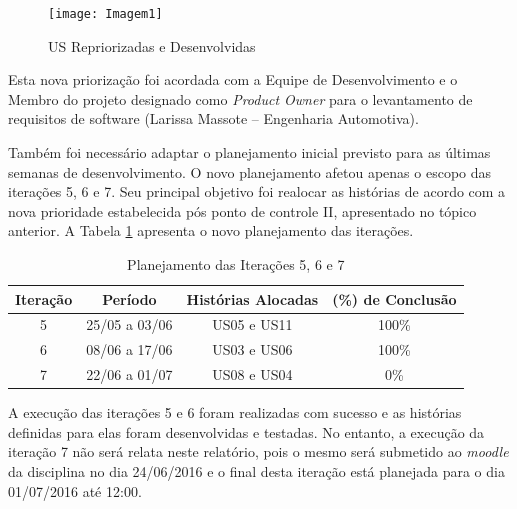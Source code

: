		\begin{figure}[htpb]
			\centering
			\texttt{[image: Imagem1]}
			\caption{US Repriorizadas e Desenvolvidas}
			\label{Imagem1}
		\end{figure}

		Esta nova priorização foi acordada com a Equipe de Desenvolvimento e o Membro do projeto designado como \textit{Product Owner} para o levantamento de requisitos de software (Larissa Massote – Engenharia Automotiva).


		Também foi necessário adaptar o planejamento inicial previsto para as últimas semanas de desenvolvimento. O novo planejamento afetou apenas o escopo das iterações 5, 6 e 7. Seu principal objetivo foi realocar as histórias de acordo com a nova prioridade estabelecida pós ponto de controle II, apresentado no tópico anterior. A Tabela \ref{Tabela1} apresenta o novo planejamento das iterações.

		\begin{table}[htpb]
		\centering
		\caption{Planejamento das Iterações 5, 6 e 7}
		\label{Tabela1}
		\begin{tabular}{|c|c|c|c|}
		\hline
		\rowcolor[HTML]{C0C0C0} 
		{\color[HTML]{000000} \textbf{Iteração}} & {\color[HTML]{000000} \textbf{Período}} & {\color[HTML]{000000} \textbf{Histórias Alocadas}} & {\color[HTML]{000000} \textbf{(\%) de Conclusão}} \\ \hline
		{\color[HTML]{000000} 5} & {\color[HTML]{000000} 25/05 a 03/06} & {\color[HTML]{000000} US05 e US11} & {\color[HTML]{000000} 100\%} \\ \hline
		{\color[HTML]{000000} 6} & {\color[HTML]{000000} 08/06 a 17/06} & {\color[HTML]{000000} US03 e US06} & {\color[HTML]{000000} 100\%} \\ \hline
		{\color[HTML]{000000} 7} & {\color[HTML]{000000} 22/06 a 01/07} & {\color[HTML]{000000} US08 e US04} & {\color[HTML]{000000} 0\%} \\ \hline
		\end{tabular}
		\end{table}

		A execução das iterações 5 e 6 foram realizadas com sucesso e as histórias definidas para elas foram desenvolvidas e testadas. No entanto, a execução da iteração 7 não será relata neste relatório, pois o mesmo será submetido ao \textit{moodle} da disciplina no dia 24/06/2016 e o final desta iteração está planejada para o dia 01/07/2016 até 12:00.

